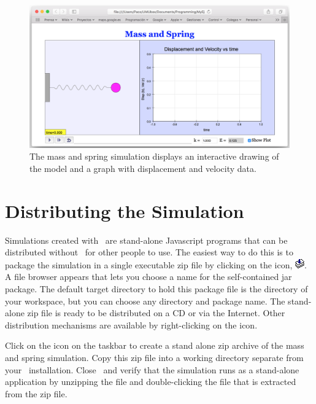 \begin{figure}[htb]
  \centering
  \includegraphics[scale=\scale]{03ExplorationJavascript/images/SpringRunning.png}
  \caption{The mass and spring simulation displays an interactive drawing of the model and a graph with displacement and velocity data.}
  \label{fig:03ExplorationJavascript/SpringRunning}
\end{figure}

\section{Distributing the Simulation}\label{section:03ExplorationJavascriptDistributing}
%
Simulations created with \ejs\ are stand-alone Javascript programs that can be distributed without \ejs\ for other people to use.  The easiest way to do this is to package the simulation in a single executable zip file by clicking on the  icon, \includegraphics[scale=\linescale]{../_common/icons_png/package.png}. A file browser appears that lets you choose a name for the self-contained jar package.  The default target directory to hold this package file is the  directory of your workspace, but you can choose any directory and package name. The stand-alone zip file is ready to be distributed on a CD or via the Internet.  Other distribution mechanisms are available by right-clicking on the icon.

\begin{exercise}\label{ex:03ExplorationJavascript/distribution}
Click on the  icon on the taskbar to create a stand alone zip archive of the mass and spring simulation.  Copy this zip file into a working directory separate from your \ejs\ installation.  Close \ejs\ and verify that the simulation runs as a stand-alone application by unzipping the file and double-clicking the  file that is extracted from the zip file.
\end{exercise}


